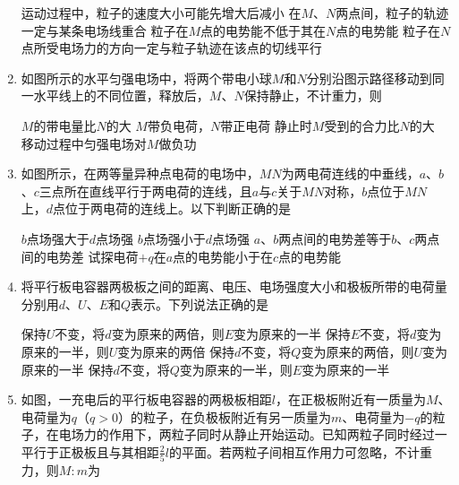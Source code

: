 \begin{enumerate}[leftmargin=0em]
\fourchoices
{运动过程中，粒子的速度大小可能先增大后减小}
{在$ M $、$ N $两点间，粒子的轨迹一定与某条电场线重合}
{粒子在$ M $点的电势能不低于其在$ N $点的电势能}
{粒子在$ N $点所受电场力的方向一定与粒子轨迹在该点的切线平行}







\item
{}
如图所示的水平匀强电场中，将两个带电小球$ M $和$ N $分别沿图示路径移动到同一水平线上的不同位置，释放后，$ M $、$ N $保持静止，不计重力，则  
\begin{figure}[h!]
\centering

\end{figure}


\fourchoices
{$ M $的带电量比$ N $的大 }
{$ M $带负电荷，$ N $带正电荷}
{静止时$ M $受到的合力比$ N $的大 }
{移动过程中匀强电场对$ M $做负功}

\item
{}
如图所示，在两等量异种点电荷的电场中，$ MN $为两电荷连线的中垂线，$ a $、$ b $、$ c $三点所在直线平行于两电荷的连线，且$ a $与$ c $关于$ MN $对称，$ b $点位于$ MN $上，$ d $点位于两电荷的连线上。以下判断正确的是  
\begin{figure}[h!]
\centering

\end{figure}


\fourchoices
{$ b $点场强大于$ d $点场强 }
{$ b $点场强小于$ d $点场强}
{$ a $、$ b $两点间的电势差等于$ b $、$ c $两点间的电势差}
{试探电荷$ +q $在$ a $点的电势能小于在$ c $点的电势能}


\item
{}
将平行板电容器两极板之间的距离、电压、电场强度大小和极板所带的电荷量分别用$ d $、$ U $、$ E $和$ Q $表示。下列说法正确的是  


\fourchoices
{保持$ U $不变，将$ d $变为原来的两倍，则$ E $变为原来的一半}
{保持$ E $不变，将$ d $变为原来的一半，则$ U $变为原来的两倍}
{保持$ d $不变，将$ Q $变为原来的两倍，则$ U $变为原来的一半}
{保持$ d $不变，将$ Q $变为原来的一半，则$ E $变为原来的一半}



\item
{}
如图，一充电后的平行板电容器的两极板相距$ l $，在正极板附近有一质量为$ M $、电荷量为$ q $（$ q > 0 $）的粒子，在负极板附近有另一质量为$ m $、电荷量为$ -q $的粒子，在电场力的作用下，两粒子同时从静止开始运动。已知两粒子同时经过一平行于正极板且与其相距$ \frac{ 2 }{ 5 } l $的平面。若两粒子间相互作用力可忽略，不计重力，则$ M : m $为  
\begin{figure}[h!]
	\centering
	
\end{figure}


\end{enumerate}

